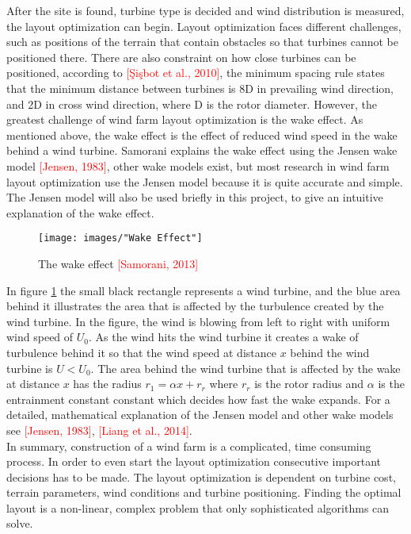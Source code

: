 \noindent After the site is found, turbine type is decided and wind distribution is measured, the layout optimization can begin. Layout optimization faces different challenges, such as positions of the terrain that contain obstacles so that turbines cannot be positioned there. There are also constraint on how close turbines can be positioned, according to \textcolor{red}{[\c{S}i\c{s}bot et al., 2010]}, the minimum spacing rule states that the minimum distance between turbines is 8D in prevailing wind direction, and 2D in cross wind direction, where D is the rotor diameter. However, the greatest challenge of wind farm layout optimization is the wake effect. As mentioned above, the wake effect is the effect of reduced wind speed in the wake behind a wind turbine. Samorani explains the wake effect using the Jensen wake model \textcolor{red}{[Jensen, 1983]}, other wake models exist, but most research in wind farm layout optimization use the Jensen model because it is quite accurate and simple. The Jensen model will also be used briefly in this project, to give an intuitive explanation of the wake effect. 

\begin{figure}[h!]
\begin{center}
\texttt{[image: images/"Wake Effect"]}
\caption{The wake effect \textcolor{red}{[Samorani, 2013]}}
\label{Wake effect}
\end{center}
\end{figure}

In figure \ref{Wake effect} the small black rectangle represents a wind turbine, and the blue area behind it illustrates the area that is affected by the turbulence created by the wind turbine. In the figure, the wind is blowing from left to right with uniform wind speed of $U_0$. As the wind hits the wind turbine it creates a wake of turbulence behind it so that the wind speed at distance $x$ behind the wind turbine is $U < U_0$. The area behind the wind turbine that is affected by the wake at distance $x$ has the radius $r_1 = \alpha x + r_r$ where $r_r$ is the rotor radius and $\alpha$ is the entrainment constant constant which decides how fast the wake expands. For a detailed, mathematical explanation of the Jensen model and other wake models see \textcolor{red}{[Jensen, 1983]}, \textcolor{red}{[Liang et al., 2014]}.\\

\noindent In summary, construction of a wind farm is a complicated, time consuming process. In order to even start the layout optimization consecutive important decisions has to be made. The layout optimization is dependent on turbine cost, terrain parameters, wind conditions and turbine positioning. Finding the optimal layout is a non-linear, complex problem that only sophisticated algorithms can solve.


